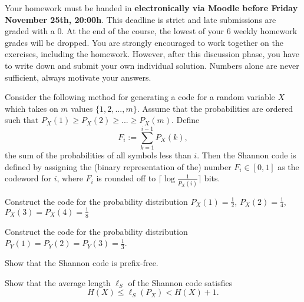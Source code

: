 \documentclass[a4paper,10pt,landscape,twocolumn]{scrartcl}
\newcommand\deadline{Friday November 25th, 20:00h}
\begin{document}
\homeworkproblems

{\sffamily\noindent
Your homework must be handed in \textbf{electronically via Moodle before \deadline}. This deadline is strict and late submissions are graded with a 0. At the end of the course, the lowest of your 6 weekly homework grades will be dropped. You are strongly encouraged to work together on the exercises, including the homework. However, after this discussion phase, you have to write down and submit your own individual solution. Numbers alone are never sufficient, always motivate your answers.
}

\begin{exercise}
Consider the following method for generating a code for a random variable $X$ which takes on $m$ values $\{1,2,...,m\}$. Assume that the probabilities are ordered such that $P_X(1) \geq P_X(2) \geq ... \geq P_X(m)$. Define
\[
F_i := \sum_{k=1}^{i-1} P_X(k),
\]
the sum of the probabilities of all symbols less than $i$. Then the Shannon code is defined by assigning the (binary representation of the) number $F_i \in [0,1]$ as the codeword for $i$, where $F_i$ is rounded off to $\lceil \log\frac{1}{P_X(i)}\rceil$ bits.
	\begin{subex}[(1pt)]
	Construct the code for the probability distribution $P_X(1) = \frac{1}{2}$, $P_X(2) = \frac{1}{4}$, $P_X(3) = P_X(4) = \frac{1}{8}$
	\end{subex}
	\begin{subex}[(1pt)]
	Construct the code for the probability distribution $P_Y(1) = P_Y(2) = P_Y(3) = \frac{1}{3}$.
	\end{subex}
	\begin{subex}[(2pt)]
	Show that the Shannon code is prefix-free.
	\end{subex}
	\begin{subex}[(2pt)]
	Show that the average length $\ell_S$ of the Shannon code satisfies
	\[
	H(X) \leq \ell_S(P_X) < H(X) + 1.
	\]
	\end{subex}
\end{exercise}



\newcommand{\typsetA}{A^{(n)}_{\varepsilon}}
\newcommand{\typsetB}{B^{(n)}_{\delta}}
\end{document}
